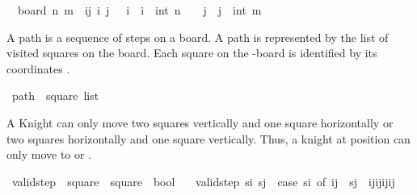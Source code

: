 \begin{isabellebody}
\ \ {\isachardoublequoteopen}board\ n\ m\ {\isacharequal}{\kern0pt}\ {\isacharbraceleft}{\kern0pt}{\isacharparenleft}{\kern0pt}i{\isacharcomma}{\kern0pt}j{\isacharparenright}{\kern0pt}\ {\isacharbar}{\kern0pt}i\ j{\isachardot}{\kern0pt}\ {}\ {\isasymle}\ i\ {\isasymand}\ i\ {\isasymle}\ int\ n\ {\isasymand}\ {}\ {\isasymle}\ j\ {\isasymand}\ j\ {\isasymle}\ int\ m{\isacharbraceright}{\kern0pt}{\isachardoublequoteclose}%
\begin{isamarkuptext}%
A path is a sequence of steps on a board. A path is represented by the list of visited 
squares on the board. Each square on the -board is identified by its coordinates .%
\end{isamarkuptext}\isamarkuptrue%
\isamarkupfalse%
\ path\ {\isacharequal}{\kern0pt}\ {\isachardoublequoteopen}square\ list{\isachardoublequoteclose}%
\begin{isamarkuptext}%
A Knight can only move two squares vertically and one square horizontally or two squares 
horizontally and one square vertically. Thus, a knight at position  can only move 
to  or .%
\end{isamarkuptext}\isamarkuptrue%
\isamarkupfalse%
\ valid{\isacharunderscore}{\kern0pt}step\ {\isacharcolon}{\kern0pt}{\isacharcolon}{\kern0pt}\ {\isachardoublequoteopen}square\ {\isasymRightarrow}\ square\ {\isasymRightarrow}\ bool{\isachardoublequoteclose}\ \isanewline
\ \ {\isachardoublequoteopen}valid{\isacharunderscore}{\kern0pt}step\ s\isactrlsub i\ s\isactrlsub j\ {\isasymequiv}\ {\isacharparenleft}{\kern0pt}case\ s\isactrlsub i\ of\ {\isacharparenleft}{\kern0pt}i{\isacharcomma}{\kern0pt}j{\isacharparenright}{\kern0pt}\ {\isasymRightarrow}\ s\isactrlsub j\ {\isasymin}\ {\isacharbraceleft}{\kern0pt}{\isacharparenleft}{\kern0pt}i{\isacharplus}{\kern0pt}{}{\isacharcomma}{\kern0pt}j{\isacharplus}{\kern0pt}{}{\isacharparenright}{\kern0pt}{\isacharcomma}{\kern0pt}{\isacharparenleft}{\kern0pt}i{\isacharminus}{\kern0pt}{}{\isacharcomma}{\kern0pt}j{\isacharplus}{\kern0pt}{}{\isacharparenright}{\kern0pt}{\isacharcomma}{\kern0pt}{\isacharparenleft}{\kern0pt}i{\isacharplus}{\kern0pt}{}{\isacharcomma}{\kern0pt}j{\isacharminus}{\kern0pt}{}{\isacharparenright}{\kern0pt}{\isacharcomma}{\kern0pt}{\isacharparenleft}{\kern0pt}i{\isacharminus}{\kern0pt}{}{\isacharcomma}{\kern0pt}j{\isacharminus}{\kern0pt}{}{\isacharparenright}{\kern0pt}{\isacharcomma}{\kern0pt}\isanewline

\end{isabellebody}
